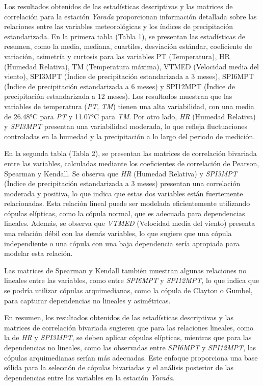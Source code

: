 \begin{figure}[htbp]
\end{figure}




Los resultados obtenidos de las estadísticas descriptivas y las matrices de correlación para la estación \textit{Yarada} proporcionan información detallada sobre las relaciones entre las variables meteorológicas y los índices de precipitación estandarizada. En la primera tabla (Tabla 1), se presentan las estadísticas de resumen, como la media, mediana, cuartiles, desviación estándar, coeficiente de variación, asimetría y curtosis para las variables PT (Temperatura), HR (Humedad Relativa), TM (Temperatura máxima), VTMED (Velocidad media del viento), SPI3MPT (Índice de precipitación estandarizada a 3 meses), SPI6MPT (Índice de precipitación estandarizada a 6 meses) y SPI12MPT (Índice de precipitación estandarizada a 12 meses). Los resultados muestran que las variables de temperatura (\textit{PT}, \textit{TM}) tienen una alta variabilidad, con una media de 26.48°C para \textit{PT} y 11.07°C para \textit{TM}. Por otro lado, \textit{HR} (Humedad Relativa) y \textit{SPI3MPT} presentan una variabilidad moderada, lo que refleja fluctuaciones controladas en la humedad y la precipitación a lo largo del periodo de medición.

En la segunda tabla (Tabla 2), se presentan las matrices de correlación bivariada entre las variables, calculadas mediante los coeficientes de correlación de Pearson, Spearman y Kendall. Se observa que \textit{HR} (Humedad Relativa) y \textit{SPI3MPT} (Índice de precipitación estandarizada a 3 meses) presentan una correlación moderada y positiva, lo que indica que estas dos variables están fuertemente relacionadas. Esta relación lineal puede ser modelada eficientemente utilizando cópulas elípticas, como la cópula normal, que es adecuada para dependencias lineales. Además, se observa que \textit{VTMED} (Velocidad media del viento) presenta una relación débil con las demás variables, lo que sugiere que una cópula independiente o una cópula con una baja dependencia sería apropiada para modelar esta relación.

Las matrices de Spearman y Kendall también muestran algunas relaciones no lineales entre las variables, como entre \textit{SPI6MPT} y \textit{SPI12MPT}, lo que indica que se podría utilizar cópulas arquimedianas, como la cópula de Clayton o Gumbel, para capturar dependencias no lineales y asimétricas.

En resumen, los resultados obtenidos de las estadísticas descriptivas y las matrices de correlación bivariada sugieren que para las relaciones lineales, como la de \textit{HR} y \textit{SPI3MPT}, se deben aplicar cópulas elípticas, mientras que para las dependencias no lineales, como las observadas entre \textit{SPI6MPT} y \textit{SPI12MPT}, las cópulas arquimedianas serían más adecuadas. Este enfoque proporciona una base sólida para la selección de cópulas bivariadas y el análisis posterior de las dependencias entre las variables en la estación \textit{Yarada}.



